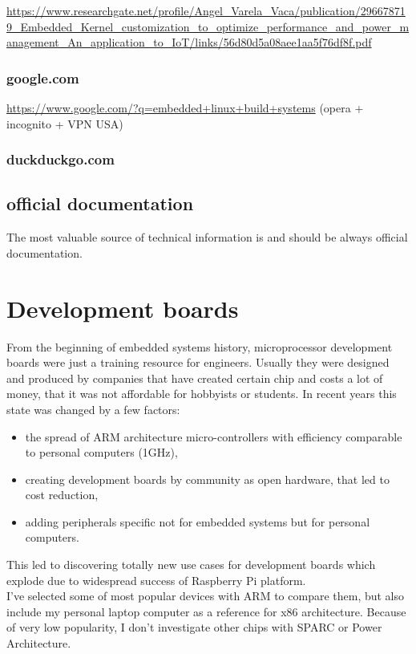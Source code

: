 \documentclass[printmode]{mgr}
\begin{document}
\url{https://www.researchgate.net/profile/Angel_Varela_Vaca/publication/296678719_Embedded_Kernel_customization_to_optimize_performance_and_power_management_An_application_to_IoT/links/56d80d5a08aee1aa5f76df8f.pdf}

\subsection{google.com}

\url{https://www.google.com/?q=embedded+linux+build+systems} (opera + incognito + VPN USA)

\subsection{duckduckgo.com}

\section{official documentation}

The most valuable source of technical information is and should be always official documentation.

\chapter{Development boards}
\label{chapter:development-boards}

From the beginning of embedded systems history, microprocessor development boards were just a training resource for engineers.
Usually they were designed and produced by companies that have created certain chip and costs a lot of money, that it was not affordable for hobbyists or students.
In recent years this state was changed by a few factors:
\begin{itemize}
  \item the spread of ARM architecture micro-controllers with efficiency comparable to personal computers (1GHz),
  \item creating development boards by community as open hardware, that led to cost reduction,
  \item adding peripherals specific not for embedded systems but for personal computers.
\end{itemize}
This led to discovering totally new use cases for development boards which explode due to widespread success of Raspberry Pi platform. \\
I've selected some of most popular devices with ARM to compare them, but also include my personal laptop computer as a reference for x86 architecture. Because of very low popularity, I don't investigate other chips with SPARC or Power Architecture. \\
\end{document}
